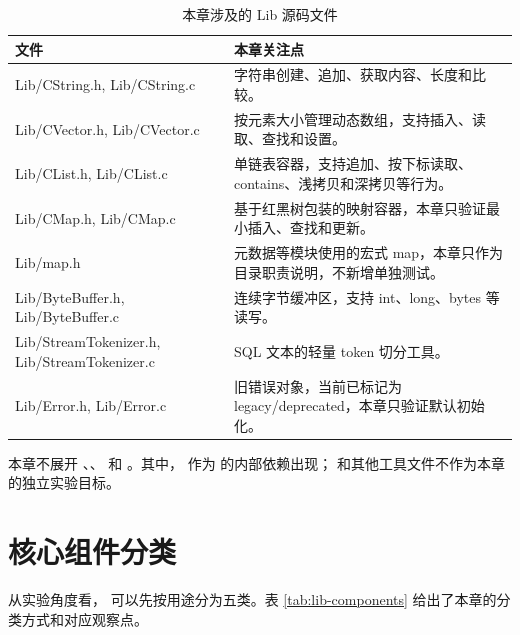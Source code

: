 \begin{table}[htbp]
  \centering
  \caption{本章涉及的 Lib 源码文件}
  \label{tab:lib-source-files}
  \begin{tabularx}{\textwidth}{>{\ttfamily}l Y}
    \toprule
    文件 & 本章关注点 \\
    \midrule
    Lib/CString.h, Lib/CString.c & 字符串创建、追加、获取内容、长度和比较。 \\
    Lib/CVector.h, Lib/CVector.c & 按元素大小管理动态数组，支持插入、读取、查找和设置。 \\
    Lib/CList.h, Lib/CList.c & 单链表容器，支持追加、按下标读取、contains、浅拷贝和深拷贝等行为。 \\
    Lib/CMap.h, Lib/CMap.c & 基于红黑树包装的映射容器，本章只验证最小插入、查找和更新。 \\
    Lib/map.h & 元数据等模块使用的宏式 map，本章只作为目录职责说明，不新增单独测试。 \\
    Lib/ByteBuffer.h, Lib/ByteBuffer.c & 连续字节缓冲区，支持 int、long、bytes 等读写。 \\
    Lib/StreamTokenizer.h, Lib/StreamTokenizer.c & SQL 文本的轻量 token 切分工具。 \\
    Lib/Error.h, Lib/Error.c & 旧错误对象，当前已标记为 legacy/deprecated，本章只验证默认初始化。 \\
    \bottomrule
  \end{tabularx}
\end{table}

本章不展开 、、 和 。其中， 作为  的内部依赖出现； 和其他工具文件不作为本章的独立实验目标。

\section{核心组件分类}
\label{sec:lib-components}

从实验角度看， 可以先按用途分为五类。表 \ref{tab:lib-components} 给出了本章的分类方式和对应观察点。

